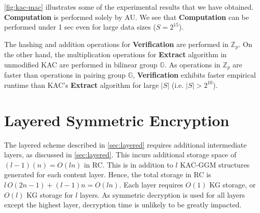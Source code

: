 \documentclass[hyp,a4paper,12pt,openbib]{socreport}
\begin{document}
\cref{fig:kac-mac} illustrates some of the experimental results that we have obtained. \textbf{Computation} is performed solely by AU. We see that \textbf{Computation} can be performed under 1 sec even for large data sizes ($S=2^{15}$). 

The hashing and addition operations for \textbf{Verification} are performed in $\mathbb{Z}_p$. On the other hand, the multiplication operations for \textbf{Extract} algorithm in unmodified KAC are performed in bilinear group $\mathbb{G}$. As operations in $\mathbb{Z}_p$ are faster than operations in pairing group $\mathbb{G}$, \textbf{Verification} exhibits faster empirical runtime than KAC's \textbf{Extract} algorithm for large $|S|$ (i.e. $|S|>2^{10}$).



\section{Layered Symmetric Encryption}
\label{sec:layer-analyze}
The layered scheme described in \cref{sec:layered} requires additional intermediate layers, as discussed in \cref{sec:layered}. This incurs additional storage space of $(l-1)(n) = O(ln)$ in RC. This is in addition to $l$ KAC-GGM structures generated for each content layer. Hence, the total storage in RC is $l \, O(2n-1) + (l-1)n = O(ln)$. Each layer requires $O(1)$ KG storage, or $O(l)$ KG storage for $l$ layers. As symmetric decryption is used for all layers except the highest layer, decryption time is unlikely to be greatly impacted. 




%
%



\end{document}
